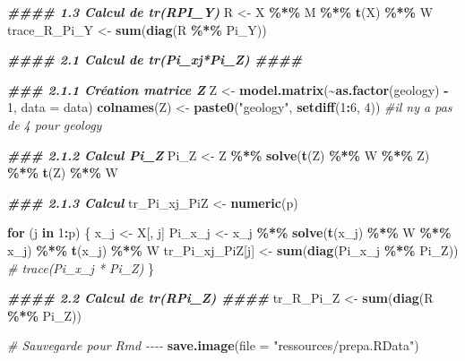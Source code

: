 \documentclass[
]{article}
\newenvironment{Shaded}{\begin{snugshade}}{\end{snugshade}}
\newcommand{\AttributeTok}[1]{\textcolor[rgb]{0.13,0.29,0.53}{#1}}
\newcommand{\CommentTok}[1]{\textcolor[rgb]{0.56,0.35,0.01}{\textit{#1}}}
\newcommand{\ControlFlowTok}[1]{\textcolor[rgb]{0.13,0.29,0.53}{\textbf{#1}}}
\newcommand{\DecValTok}[1]{\textcolor[rgb]{0.00,0.00,0.81}{#1}}
\newcommand{\DocumentationTok}[1]{\textcolor[rgb]{0.56,0.35,0.01}{\textbf{\textit{#1}}}}
\newcommand{\FunctionTok}[1]{\textcolor[rgb]{0.13,0.29,0.53}{\textbf{#1}}}
\newcommand{\NormalTok}[1]{#1}
\newcommand{\OtherTok}[1]{\textcolor[rgb]{0.56,0.35,0.01}{#1}}
\newcommand{\SpecialCharTok}[1]{\textcolor[rgb]{0.81,0.36,0.00}{\textbf{#1}}}
\newcommand{\StringTok}[1]{\textcolor[rgb]{0.31,0.60,0.02}{#1}}
\begin{document}
\begin{Shaded}
\begin{Highlighting}[]
\DocumentationTok{\#\#\#\# 1.3 Calcul de tr(RPI\_Y)}
\NormalTok{R }\OtherTok{\textless{}{-}}\NormalTok{ X }\SpecialCharTok{\%*\%}\NormalTok{ M }\SpecialCharTok{\%*\%} \FunctionTok{t}\NormalTok{(X) }\SpecialCharTok{\%*\%}\NormalTok{ W}
\NormalTok{trace\_R\_Pi\_Y }\OtherTok{\textless{}{-}} \FunctionTok{sum}\NormalTok{(}\FunctionTok{diag}\NormalTok{(R }\SpecialCharTok{\%*\%}\NormalTok{ Pi\_Y))}

\DocumentationTok{\#\#\#\# 2.1 Calcul de tr(Pi\_xj*Pi\_Z) \#\#\#\#}

\DocumentationTok{\#\#\# 2.1.1 Création matrice Z}
\NormalTok{Z }\OtherTok{\textless{}{-}} \FunctionTok{model.matrix}\NormalTok{(}\SpecialCharTok{\textasciitilde{}}\FunctionTok{as.factor}\NormalTok{(geology) }\SpecialCharTok{{-}} \DecValTok{1}\NormalTok{, }\AttributeTok{data =}\NormalTok{ data)}
\FunctionTok{colnames}\NormalTok{(Z) }\OtherTok{\textless{}{-}} \FunctionTok{paste0}\NormalTok{(}\StringTok{"geology"}\NormalTok{, }\FunctionTok{setdiff}\NormalTok{(}\DecValTok{1}\SpecialCharTok{:}\DecValTok{6}\NormalTok{, }\DecValTok{4}\NormalTok{))  }\CommentTok{\#il n\textquotesingle{}y a pas de 4 pour geology }

\DocumentationTok{\#\#\# 2.1.2 Calcul Pi\_Z}
\NormalTok{Pi\_Z }\OtherTok{\textless{}{-}}\NormalTok{ Z }\SpecialCharTok{\%*\%} \FunctionTok{solve}\NormalTok{(}\FunctionTok{t}\NormalTok{(Z) }\SpecialCharTok{\%*\%}\NormalTok{ W }\SpecialCharTok{\%*\%}\NormalTok{ Z) }\SpecialCharTok{\%*\%} \FunctionTok{t}\NormalTok{(Z) }\SpecialCharTok{\%*\%}\NormalTok{ W}

\DocumentationTok{\#\#\# 2.1.3 Calcul}
\NormalTok{tr\_Pi\_xj\_PiZ }\OtherTok{\textless{}{-}} \FunctionTok{numeric}\NormalTok{(p)}

\ControlFlowTok{for}\NormalTok{ (j }\ControlFlowTok{in} \DecValTok{1}\SpecialCharTok{:}\NormalTok{p) \{}
\NormalTok{    x\_j }\OtherTok{\textless{}{-}}\NormalTok{ X[, j]}
\NormalTok{    Pi\_x\_j }\OtherTok{\textless{}{-}}\NormalTok{ x\_j }\SpecialCharTok{\%*\%} \FunctionTok{solve}\NormalTok{(}\FunctionTok{t}\NormalTok{(x\_j) }\SpecialCharTok{\%*\%}\NormalTok{ W }\SpecialCharTok{\%*\%}\NormalTok{ x\_j) }\SpecialCharTok{\%*\%} \FunctionTok{t}\NormalTok{(x\_j) }\SpecialCharTok{\%*\%}\NormalTok{ W}
\NormalTok{    tr\_Pi\_xj\_PiZ[j] }\OtherTok{\textless{}{-}} \FunctionTok{sum}\NormalTok{(}\FunctionTok{diag}\NormalTok{(Pi\_x\_j }\SpecialCharTok{\%*\%}\NormalTok{ Pi\_Z))  }\CommentTok{\# trace(Pi\_x\_j * Pi\_Z)}
\NormalTok{\}}

\DocumentationTok{\#\#\#\# 2.2 Calcul de tr(RPi\_Z) \#\#\#\#}
\NormalTok{tr\_R\_Pi\_Z }\OtherTok{\textless{}{-}} \FunctionTok{sum}\NormalTok{(}\FunctionTok{diag}\NormalTok{(R }\SpecialCharTok{\%*\%}\NormalTok{ Pi\_Z))}

\CommentTok{\# Sauvegarde pour Rmd {-}{-}{-}{-}}
\FunctionTok{save.image}\NormalTok{(}\AttributeTok{file =} \StringTok{"ressources/prepa.RData"}\NormalTok{)}
\end{Highlighting}
\end{Shaded}
\end{document}
